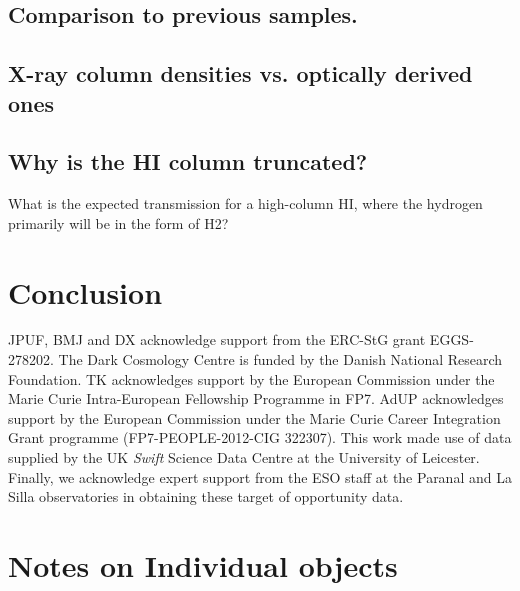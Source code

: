 \documentclass[iop, twocolappendix, numberedappendix, tighten, appendixfloats]{emulateapj}
\begin{document}
		
	\subsection{Comparison to previous samples.}		
	
	
	\subsection{X-ray column densities vs. optically derived ones}	
		
	\subsection{Why is the HI column truncated?}
	
	What is the expected transmission for a high-column HI, where the hydrogen primarily will be in the form of H2? 
	
	
	
	
	\section{Conclusion}
	
	
	\begin{acknowledgements}
		JPUF, BMJ and DX acknowledge support from the ERC-StG grant EGGS-278202.  The
		Dark Cosmology Centre is funded by the Danish National Research Foundation.  TK
		acknowledges support by the European Commission under the Marie Curie
		Intra-European Fellowship Programme in FP7.  AdUP acknowledges support by the
		European Commission under the Marie Curie Career Integration Grant programme
		(FP7-PEOPLE-2012-CIG 322307).  This work made use of data supplied by the UK
		{\it Swift} Science Data Centre at the University of Leicester.  Finally, we
		acknowledge expert support from the ESO staff at the Paranal and La Silla
		observatories in obtaining these target of opportunity data.
		
	\end{acknowledgements}
	
	\def\aj{AJ}
	\def\araa{ARA\&A}
	\def\apj{ApJ}
	\def\apjl{ApJL}
	\def\apjs{ApJS}
	\def\apss{Ap\&SS}
	\def\aap{A\&A}
	\def\aapr{A\&A~Rev.}
	\def\aaps{A\&AS}
	\def\mnras{MNRAS}
	\def\nat{Nature}
	\def\pasp{PASP}
	\def\aplett{Astrophys.~Lett.}
	
	
	
	
	
	\newpage
	\appendix

	\section{Notes on Individual objects}
	
\end{document}
